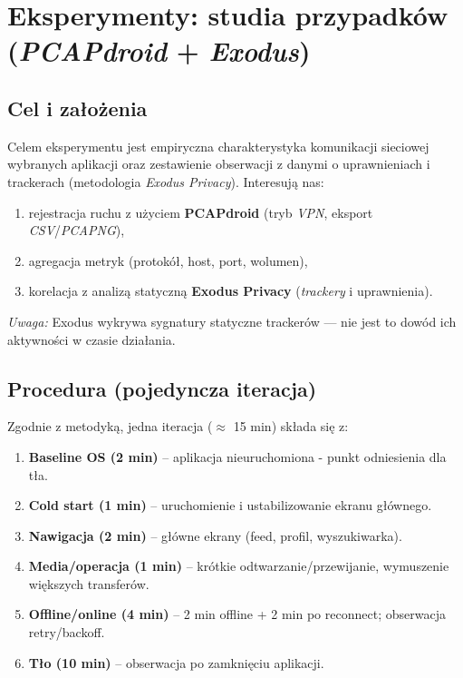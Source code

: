 \chapter{Eksperymenty: studia przypadków (\emph{PCAPdroid} + \emph{Exodus})}
\label{chap:case-studies}

\section{Cel i założenia}
Celem eksperymentu jest empiryczna charakterystyka komunikacji sieciowej wybranych aplikacji oraz zestawienie obserwacji z danymi o uprawnieniach i trackerach (metodologia \emph{Exodus Privacy}). Interesują nas:
\begin{enumerate}
  \item rejestracja ruchu z użyciem \textbf{PCAPdroid} (tryb \emph{VPN}, eksport \emph{CSV}/\emph{PCAPNG}),
  \item agregacja metryk (protokół, host, port, wolumen),
  \item korelacja z analizą statyczną \textbf{Exodus Privacy} (\emph{trackery} i uprawnienia).
\end{enumerate}

\emph{Uwaga:} 
Exodus wykrywa sygnatury statyczne trackerów — nie jest to dowód ich aktywności w czasie działania.


\section{Procedura (pojedyncza iteracja)}
Zgodnie z metodyką, jedna iteracja ($\approx$ 15 min) składa się z: 
\begin{enumerate}
  \item \textbf{Baseline OS (2 min)} – aplikacja nieuruchomiona - punkt odniesienia dla tła.
  \item \textbf{Cold start (1 min)} – uruchomienie i ustabilizowanie ekranu głównego.
  \item \textbf{Nawigacja (2 min)} – główne ekrany (feed, profil, wyszukiwarka).
  \item \textbf{Media/operacja (1 min)} – krótkie odtwarzanie/przewijanie, wymuszenie większych transferów.
  \item \textbf{Offline/online (4 min)} – 2 min offline + 2 min po reconnect; obserwacja retry/backoff.
  \item \textbf{Tło (10 min)} –  obserwacja po zamknięciu aplikacji.
\end{enumerate}

